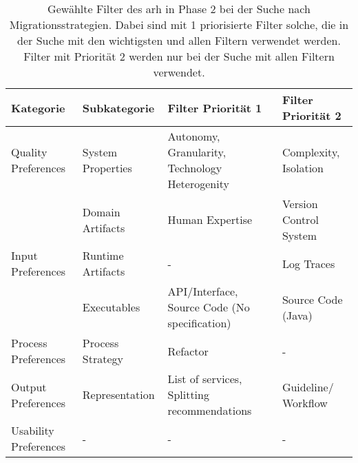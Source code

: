 \begin{table}%
  \centering
  \begin{tabular}{m{3cm} l m{4cm} m{3.5cm}}
    \hline
    \textbf{Kategorie} & \textbf{Subkategorie} & \textbf{Filter Priorität 1} & \textbf{Filter Priorität 2} \\ \hline
    Quality Preferences & System Properties & Autonomy, Granularity, Tech\-nology Heterogenity & Complexity, Isolation \\ \hline
    \multirow{3}{=}[-0.6cm]{Input Preferences} & Domain Artifacts & Human Expertise & Version Control Sys\-tem \\ 
     & Runtime Artifacts & - & Log Traces \\ 
     & Executables & API/Interface, Source Code (No specifica\-tion) & Source Code (Java) \\ \hline
    Process Preferences & Process Strategy & Refactor & - \\ \hline
    Output Preferences & Representation & List of services, Split\-ting recommendations & Guideline/ Workflow \\ \hline
    Usability Preferences & - & - & - \\ \hline
  \end{tabular}
  \caption[Gewählte Filter des \gls{arh} in Phase 2]{
    Gewählte Filter des \gls{arh} in Phase 2 bei der Suche nach Migrationsstrategien.
    Dabei sind mit 1 priorisierte Filter solche, die in der Suche mit den wichtigsten und allen Filtern verwendet werden.
    Filter mit Priorität 2 werden nur bei der Suche mit allen Filtern verwendet.
  }
  \label{tab:phase2-selected-filter}
\end{table}
